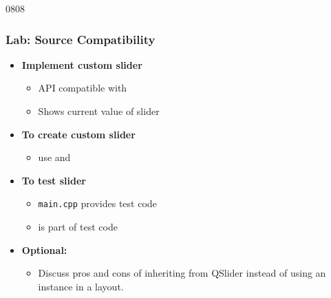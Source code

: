 \begin{slide}{0808}
\frametitle{Lab: Source Compatibility}
\label{project_slider_with_indicator}
 \begin{itemize}
  \item \textbf{Implement custom slider}
    \begin{itemize}
    \item API compatible with 
    \item Shows current value of slider
    \end{itemize}
 \item \textbf{To create custom slider}
    \begin{itemize}
    \item use  and 
    \end{itemize}
  \item \textbf{To test slider}
    \begin{itemize}
    \item \texttt{main.cpp} provides test code
    \item {} is part of test code
    \end{itemize}
  \item \textbf{Optional:}
    \begin{itemize}
    \item  Discuss pros and cons of inheriting from
      QSlider instead of using an instance in a layout.
    \end{itemize}
  \end{itemize}
  \vfill

\end{slide}
